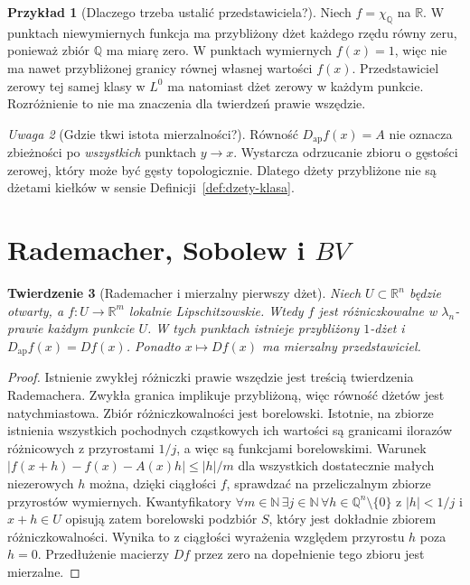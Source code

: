 \documentclass[11pt,a4paper,oneside]{book}
\numberwithin{equation}{chapter}
\theoremstyle{plain}
\newtheorem{twierdzenie}{Twierdzenie}[chapter]
\theoremstyle{definition}
\newtheorem{przyklad}[twierdzenie]{Przykład}
\theoremstyle{remark}
\newtheorem{uwaga}[twierdzenie]{Uwaga}
\begin{document}
\begin{przyklad}[Dlaczego trzeba ustalić przedstawiciela?]
Niech $f=\chi_{\mathbb Q}$ na $\mathbb R$. W punktach
niewymiernych funkcja ma przybliżony dżet każdego rzędu
równy zeru, ponieważ zbiór $\mathbb Q$ ma miarę zero.
W punktach wymiernych $f(x)=1$, więc nie ma nawet
przybliżonej granicy równej własnej wartości $f(x)$.
Przedstawiciel zerowy tej samej klasy w $L^0$ ma natomiast
dżet zerowy w każdym punkcie. Rozróżnienie to nie ma
znaczenia dla twierdzeń prawie wszędzie.
\end{przyklad}

\begin{uwaga}[Gdzie tkwi istota mierzalności?]
Równość $D_{\mathrm{ap}}f(x)=A$ nie oznacza
zbieżności po \emph{wszystkich} punktach $y\to x$.
Wystarcza odrzucanie zbioru o gęstości zerowej,
który może być gęsty topologicznie. Dlatego dżety
przybliżone nie są dżetami kiełków w sensie
Definicji~\ref{def:dzety-klasa}.
\end{uwaga}

\section{Rademacher, Sobolew i $BV$}
\begin{twierdzenie}[Rademacher i mierzalny pierwszy dżet]
\label{thm:dzety-rademacher}
Niech $U\subset\mathbb R^n$ będzie otwarty, a
$f:U\to\mathbb R^m$ lokalnie Lipschitzowskie.
Wtedy $f$ jest różniczkowalne w $\lambda_n$-prawie każdym
punkcie $U$. W tych punktach istnieje przybliżony
$1$-dżet i $D_{\mathrm{ap}}f(x)=Df(x)$.
Ponadto $x\mapsto Df(x)$ ma mierzalny przedstawiciel.
\end{twierdzenie}
\begin{proof}
Istnienie zwykłej różniczki prawie wszędzie jest treścią
twierdzenia Rademachera. Zwykła granica implikuje
przybliżoną, więc równość dżetów jest natychmiastowa.
Zbiór różniczkowalności jest borelowski. Istotnie,
na zbiorze istnienia wszystkich pochodnych cząstkowych
ich wartości są granicami ilorazów różnicowych z
przyrostami $1/j$, a więc są funkcjami borelowskimi.
Warunek
$|f(x+h)-f(x)-A(x)h|\le |h|/m$
dla wszystkich dostatecznie małych niezerowych $h$
można, dzięki ciągłości $f$, sprawdzać na przeliczalnym
zbiorze przyrostów wymiernych. Kwantyfikatory
$\forall m\in\mathbb N\,\exists j\in\mathbb N\,
\forall h\in\mathbb Q^n\setminus\{0\}$ z $|h|<1/j$
i $x+h\in U$ opisują zatem borelowski podzbiór $S$,
który jest dokładnie zbiorem różniczkowalności.
Wynika to z ciągłości wyrażenia względem przyrostu $h$
poza $h=0$. Przedłużenie macierzy
$Df$ przez zero na dopełnienie tego zbioru jest mierzalne.
\end{proof}
\end{document}
